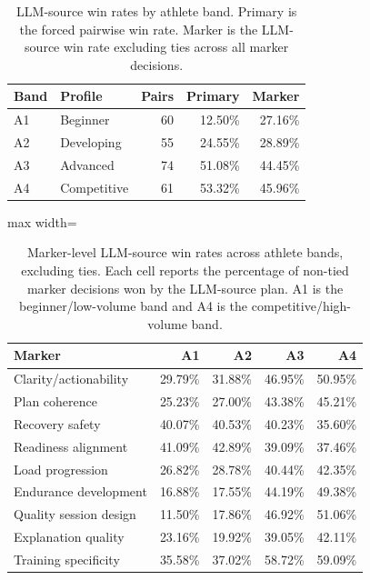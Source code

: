 \documentclass[11pt]{article}
\begin{document}
\begin{table}[H]
\centering
\small
\begin{tabular}{llrrr}
\toprule
Band & Profile & Pairs & Primary & Marker \\
\midrule
A1 & Beginner & 60 & 12.50\% & 27.16\% \\
A2 & Developing & 55 & 24.55\% & 28.89\% \\
A3 & Advanced & 74 & 51.08\% & 44.45\% \\
A4 & Competitive & 61 & 53.32\% & 45.96\% \\
\bottomrule
\end{tabular}
\caption{LLM-source win rates by athlete band. Primary is the forced pairwise win rate. Marker is the LLM-source win rate excluding ties across all marker decisions.}
\label{tab:athlete-app}
\end{table}

\begin{table}[H]
\centering
\small
\begin{adjustbox}{max width=\textwidth}
\begin{tabular}{lrrrr}
\toprule
Marker & A1 & A2 & A3 & A4 \\
\midrule
Clarity/actionability & 29.79\% & 31.88\% & 46.95\% & 50.95\% \\
Plan coherence & 25.23\% & 27.00\% & 43.38\% & 45.21\% \\
Recovery safety & 40.07\% & 40.53\% & 40.23\% & 35.60\% \\
Readiness alignment & 41.09\% & 42.89\% & 39.09\% & 37.46\% \\
Load progression & 26.82\% & 28.78\% & 40.44\% & 42.35\% \\
Endurance development & 16.88\% & 17.55\% & 44.19\% & 49.38\% \\
Quality session design & 11.50\% & 17.86\% & 46.92\% & 51.06\% \\
Explanation quality & 23.16\% & 19.92\% & 39.05\% & 42.11\% \\
Training specificity & 35.58\% & 37.02\% & 58.72\% & 59.09\% \\
\bottomrule
\end{tabular}
\end{adjustbox}
\caption{Marker-level LLM-source win rates across athlete bands, excluding ties. Each cell reports the percentage of non-tied marker decisions won by the LLM-source plan. A1 is the beginner/low-volume band and A4 is the competitive/high-volume band.}
\label{tab:marker-band-app}
\end{table}
\end{document}

